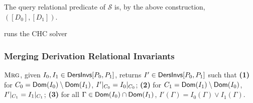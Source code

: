 The query relational predicate of $\mathcal{S}$ is, by the above
construction, $( [ D_0 ], [ D_1 ])$.

\verifyders runs the CHC solver 

\subsubsection{Merging Derivation Relational Invariants}
$\textsc{Mrg}$, given $I_0, I_1 \in \mathsf{DersInvs}[ P_0, P_1 ]$, returns $I'
\in \mathsf{DersInvs}[ P_0, P_1 ]$ such that
\textbf{(1)} for $C_0 = \mathsf{Dom}(I_0) \setminus \mathsf{Dom}(I_1)$,
$I'|_{C_0} = I_0|_{C_0}$; 
\textbf{(2)} for $C_1 = \mathsf{Dom}(I_1) \setminus \mathsf{Dom}(I_0)$,
$I'|_{C_1} = I_1|_{C_1}$;
\textbf{(3)} for all $\Gamma \in \mathsf{Dom}(I_0) \cap
\mathsf{Dom}(I_1)$, $I'(\Gamma) = I_0(\Gamma) \lor I_1(\Gamma)$.

